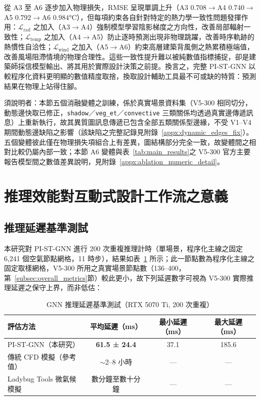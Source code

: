 從 A3 至 A6 逐步加入物理損失，RMSE 呈現單調上升（A3 $0.708\to$A4 $0.740\to$A5 $0.792\to$A6 $0.984$°C），但每項約束各自針對特定的熱力學一致性問題發揮作用：$\mathcal{L}_{\text{rad}}$ 之加入（A3$\to$A4）強制模型學習陰影梯度之方向性，改善局部輻射一致性；$\mathcal{L}_{\text{temp}}$ 之加入（A4$\to$A5）防止逐時預測出現非物理跳躍，改善時序軌跡的熱慣性自洽性；$\mathcal{L}_{\text{wind}}$ 之加入（A5$\to$A6）約束高層建築背風側之熱累積極端值，改善風場阻滯情境的物理合理性。這些一致性提升難以被純數值指標捕捉，卻是建築師採信模型輸出、將其用於實際設計決策之前提。換言之，完整 PI-ST-GNN 以較程序化資料更明顯的數值精度取捨，換取設計輔助工具最不可或缺的特質：預測結果在物理上站得住腳。

須說明者：本節五個消融變體之訓練，係於真實場景資料集（V5-300 相同切分，動態邊快取已修正，\texttt{shadow}／\texttt{veg\_et}／\texttt{convective} 三類關係均透過真實邊傳遞訊息）上重新執行，故其異質圖訊息傳遞已包含全部五類關係型邊緣，不受 V1--V4 期間動態邊缺陷之影響（該缺陷之完整記錄見附錄~\ref{appx:dynamic_edges_fix}）。五個變體彼此僅在物理損失項組合上有差異，圖結構部分完全一致，故變體間之相對比較仍屬內部一致；本節 A6 變體與表~\ref{tab:main_results}之 V5-300 官方主要報告模型間之數值差異說明，見附錄~\ref{appx:ablation_numeric_detail}。


\section{推理效能對互動式設計工作流之意義}
\label{sec:performance}

\subsection{推理延遲基準測試}
\label{subsec:inference_timing}

本研究對 PI-ST-GNN 進行 200 次重複推理計時（單場景，程序化主線之固定 6,241 個空氣節點網格，11 時步），結果如表~\ref{tab:timing} 所示；此一節點數為程序化主線之固定取樣網格，V5-300 所用之真實場景節點數（136--400，第~\ref{subsec:overall_metrics}節）較此更小，故下列延遲數字可視為 V5-300 實際推理延遲之保守上界，而非低估：

\begin{table}[htbp]
    \centering
    \caption[推理延遲基準測試]{GNN 推理延遲基準測試（RTX 5070 Ti, 200 次重複）}
    \label{tab:timing}
    \small
    \begin{tabular}{lccc}
        \toprule
        \textbf{評估方法} & \textbf{平均延遲（ms）} & \textbf{最小延遲（ms）} & \textbf{最大延遲（ms）} \\
        \midrule
        PI-ST-GNN（本研究） & \textbf{61.5 ± 24.4} & 37.1 & 185.6 \\
        傳統 CFD 模擬（參考值）& $\sim$2--8 小時 & --- & --- \\
        Ladybug Tools 微氣候模擬 & 數分鐘至數十分鐘 & --- & --- \\
        \bottomrule
    \end{tabular}
\end{table}

